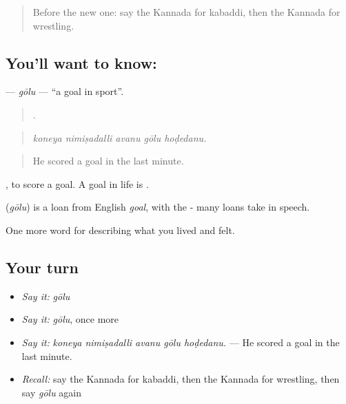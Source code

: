 \label{lesson:KA-C540-golu}



\begin{quote}
Before the new one: say the Kannada for kabaddi, then the Kannada for wrestling.
\end{quote}

\subsection*{You'll want to know: }
\textbf{} — \emph{gōlu} — \textquotedblleft{}a goal in sport\textquotedblright{}.

\begin{quote}
    .
\end{quote}

\begin{quote}
\emph{koneya nimiṣadalli avanu gōlu hoḍedanu.}
\end{quote}

\begin{quote}
He scored a goal in the last minute.
\end{quote}

 , to score a goal. A goal in life is .

\begin{cousinweb}
\textbf{} (\emph{gōlu}) is a loan from English \emph{goal}, with the - many loans take in speech.
\end{cousinweb}

\begin{grammarlens}[title={What you've built}]
One more word for describing what you lived and felt.
\end{grammarlens}

\subsection*{Your turn}
\begin{itemize}
\raggedright
  \item \emph{Say it:} \emph{gōlu}
  \item \emph{Say it:} \emph{gōlu}, once more
  \item \emph{Say it:} \emph{koneya nimiṣadalli avanu gōlu hoḍedanu.} — He scored a goal in the last minute.
  \item \emph{Recall:} say the Kannada for kabaddi, then the Kannada for wrestling, then say \emph{gōlu} again
\end{itemize}

